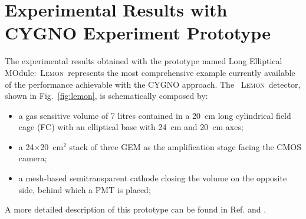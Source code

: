 \documentclass[physics,article,submit,moreauthors,pdftex]{Definitions/mdpi}
\newcommand{\lemon}{{\textsc{Lemon}}\xspace}
\begin{document}






\section{Experimental Results with CYGNO Experiment Prototype}\label{sec:results}
The experimental results obtained with the prototype named Long Elliptical MOdule:~\lemon\ represents the most comprehensive example currently available of the performance achievable with the CYGNO approach.
The ~\lemon\ detector,  shown in Fig.~\ref{fig:lemon}, is schematically composed by:
\begin{itemize}
    \item a gas sensitive volume of 7 litres contained in a 20~cm long cylindrical field cage (FC) with an elliptical base with 24~cm and 20~cm axes;
    \item a 24$\times$20~cm$^2$ stack of three GEM as the amplification stage facing the CMOS camera;
   \item a mesh-based semitransparent cathode closing the volume on the opposite side, behind which a PMT is placed;
\end{itemize}
A more detailed description of this prototype can be found in Ref.\cite{bib:fe55} and \cite{bib:lemon_btf}.
\end{document}
